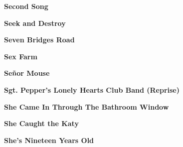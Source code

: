 \newline
\vspace{10pt} 
\begin{center}\textbf{Second Song}\end{center}
\newline
\vspace{10pt} 
\begin{center}\textbf{Seek and Destroy}\end{center}
\newline
\vspace{10pt} 
\begin{center}\textbf{Seven Bridges Road}\end{center}
\newline
\vspace{10pt} 
\begin{center}\textbf{Sex Farm}\end{center}
\newline
\vspace{10pt} 
\begin{center}\textbf{Señor Mouse}\end{center}
\newline
\vspace{10pt} 
\begin{center}\textbf{Sgt. Pepper's Lonely Hearts Club Band (Reprise)}\end{center}
\newline
\vspace{10pt} 
\begin{center}\textbf{She Came In Through The Bathroom Window}\end{center}
\newline
\vspace{10pt} 
\begin{center}\textbf{She Caught the Katy}\end{center}
\newline
\vspace{10pt} 
\begin{center}\textbf{She's Nineteen Years Old}\end{center}
\newline
